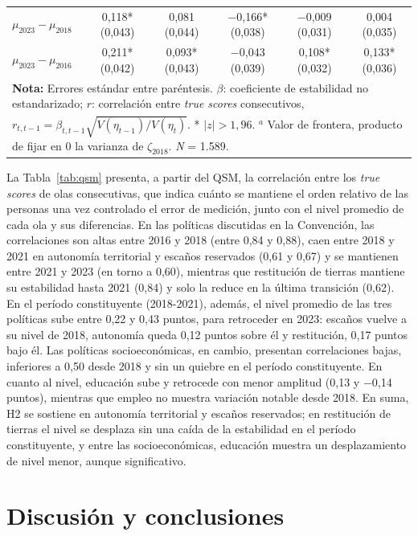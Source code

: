 \documentclass{article}
\begin{document}
\begin{table}[ht!]
{\begin{tabular}{lccccc}
$\mu_{2023}-\mu_{2018}$ & 0{,}118* (0{,}043) & 0{,}081 (0{,}044) & $-$0{,}166* (0{,}038) & $-$0{,}009 (0{,}031) & 0{,}004 (0{,}035) \\
$\mu_{2023}-\mu_{2016}$ & 0{,}211* (0{,}042) & 0{,}093* (0{,}043) & $-$0{,}043 (0{,}039) & 0{,}108* (0{,}032) & 0{,}133* (0{,}036) \\
\bottomrule
\multicolumn{6}{l}{\rule{0pt}{1em}\footnotesize\textbf{Nota:} Errores estándar entre paréntesis. $\beta$: coeficiente de estabilidad no estandarizado; $r$: correlación entre \textit{true scores} consecutivos,} \\
\multicolumn{6}{l}{\footnotesize $r_{t,t-1} = \beta_{t,t-1}\sqrt{V(\eta_{t-1})/V(\eta_t)}$. * $|z| > 1{,}96$. $^{a}$ Valor de frontera, producto de fijar en 0 la varianza de $\zeta_{2018}$. \textit{N} = 1.589.} 
\end{tabular}
}
\end{table}

La Tabla~\ref{tab:qsm} presenta, a partir del QSM, la correlación entre los \textit{true scores} de olas consecutivas, que indica cuánto se mantiene el orden relativo de las personas una vez controlado el error de medición, junto con el nivel promedio de cada ola y sus diferencias. En las políticas discutidas en la Convención, las correlaciones son altas entre 2016 y 2018 (entre 0,84 y 0,88), caen entre 2018 y 2021 en autonomía territorial y escaños reservados (0,61 y 0,67) y se mantienen entre 2021 y 2023 (en torno a 0,60), mientras que restitución de tierras mantiene su estabilidad hasta 2021 (0,84) y solo la reduce en la última transición (0,62). En el período constituyente (2018-2021), además, el nivel promedio de las tres políticas sube entre 0,22 y 0,43 puntos, para retroceder en 2023: escaños vuelve a su nivel de 2018, autonomía queda 0,12 puntos sobre él y restitución, 0,17 puntos bajo él. Las políticas socioeconómicas, en cambio, presentan correlaciones bajas, inferiores a 0,50 desde 2018 y sin un quiebre en el período constituyente. En cuanto al nivel, educación sube y retrocede con menor amplitud (0,13 y $-$0,14 puntos), mientras que empleo no muestra variación notable desde 2018. En suma, H2 se sostiene en autonomía territorial y escaños reservados; en restitución de tierras el nivel se desplaza sin una caída de la estabilidad en el período constituyente, y entre las socioeconómicas, educación muestra un desplazamiento de nivel menor, aunque significativo.


\newpage


\section{Discusión y conclusiones}
\end{document}
